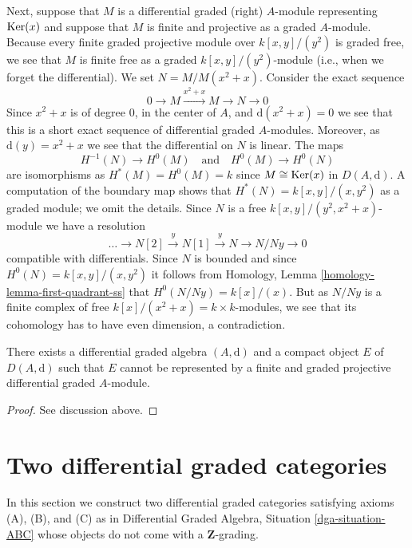 \medskip\noindent
Next, suppose that $M$ is a differential graded (right) $A$-module
representing $\mathop{\mathrm{Ker}}(x)$ and suppose that $M$ is finite and
projective as a graded $A$-module. Because every finite graded projective
module over $k[x, y]/(y^2)$ is graded free, we see that $M$ is
finite free as a graded $k[x, y]/(y^2)$-module (i.e., when we forget
the differential). We set $N = M/M(x^2 + x)$.
Consider the exact sequence
$$
0 \to M \xrightarrow{x^2 + x} M \to N \to 0
$$
Since $x^2 + x$ is of degree $0$, in the center of $A$, and
$\text{d}(x^2 + x) = 0$ we see that this is a short exact sequence
of differential graded $A$-modules. Moreover, as $\text{d}(y) = x^2 + x$
we see that the differential on $N$ is linear. The maps
$$
H^{-1}(N) \to H^0(M)
\quad\text{and}\quad
H^0(M) \to H^0(N)
$$
are isomorphisms as $H^*(M) = H^0(M) = k$ since $M \cong \mathop{\mathrm{Ker}}(x)$
in $D(A, \text{d})$. A computation of the boundary map shows that
$H^*(N) = k[x, y]/(x, y^2)$ as a graded module; we omit
the details. Since $N$ is a free $k[x, y]/(y^2, x^2 + x)$-module
we have a resolution
$$
\ldots \to N[2] \xrightarrow{y} N[1] \xrightarrow{y} N \to N/Ny \to 0
$$
compatible with differentials. Since $N$ is bounded and since
$H^0(N) = k[x,y]/(x, y^2)$ it follows from
Homology, Lemma \ref{homology-lemma-first-quadrant-ss}
that $H^0(N/Ny) = k[x]/(x)$. But as $N/Ny$ is a finite complex of free
$k[x]/(x^2 + x) = k \times k$-modules, we see that its cohomology
has to have even dimension, a contradiction.

\begin{lemma}
\label{lemma-no-good-representatif-compact-object}
There exists a differential graded algebra $(A, \text{d})$ and
a compact object $E$ of $D(A, \text{d})$ such that $E$ cannot
be represented by a finite and graded projective differential
graded $A$-module.
\end{lemma}

\begin{proof}
See discussion above.
\end{proof}







\section{Two differential graded categories}
\label{section-nongraded-differential-graded}

\noindent
In this section we construct two differential graded categories satisfying
axioms (A), (B), and (C) as in
Differential Graded Algebra, Situation \ref{dga-situation-ABC}
whose objects do not come with a $\mathbf{Z}$-grading.

